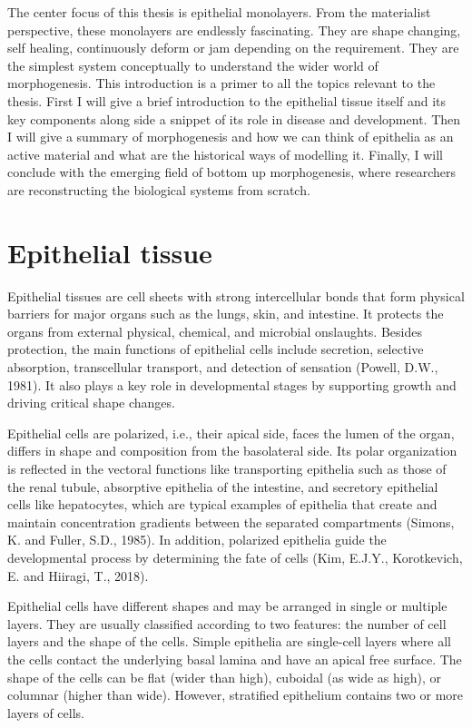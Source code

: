 The center focus of this thesis is epithelial monolayers. From the
materialist perspective, these monolayers are endlessly fascinating.
They are shape changing, self healing, continuously deform or jam
depending on the requirement. They are the simplest system conceptually
to understand the wider world of morphogenesis. This introduction is a
primer to all the topics relevant to the thesis. First I will give a
brief introduction to the epithelial tissue itself and its key
components along side a snippet of its role in disease and development.
Then I will give a summary of morphogenesis and how we can think of
epithelia as an active material and what are the historical ways of
modelling it. Finally, I will conclude with the emerging field of bottom
up morphogenesis, where researchers are reconstructing the biological
systems from scratch.

\hypertarget{epithelial-tissue}{%
	\chapter{Epithelial tissue}\label{epithelial-tissue}}

Epithelial tissues are cell sheets with strong intercellular bonds that
form physical barriers for major organs such as the lungs, skin, and
intestine. It protects the organs from external physical, chemical, and
microbial onslaughts. Besides protection, the main functions of
epithelial cells include secretion, selective absorption, transcellular
transport, and detection of sensation (Powell, D.W., 1981). It also
plays a key role in developmental stages by supporting growth and
driving critical shape changes.

Epithelial cells are polarized, i.e., their apical side, faces the lumen
of the organ, differs in shape and composition from the basolateral
side. Its polar organization is reflected in the vectoral functions like
transporting epithelia such as those of the renal tubule, absorptive
epithelia of the intestine, and secretory epithelial cells like
hepatocytes, which are typical examples of epithelia that create and
maintain concentration gradients between the separated compartments
(Simons, K. and Fuller, S.D., 1985). In addition, polarized epithelia
guide the developmental process by determining the fate of cells (Kim,
E.J.Y., Korotkevich, E. and Hiiragi, T., 2018).

Epithelial cells have different shapes and may be arranged in single or
multiple layers. They are usually classified according to two features:
the number of cell layers and the shape of the cells. Simple epithelia
are single-cell layers where all the cells contact the underlying basal
lamina and have an apical free surface. The shape of the cells can be
flat (wider than high), cuboidal (as wide as high), or columnar (higher
than wide). However, stratified epithelium contains two or more layers
of cells.

